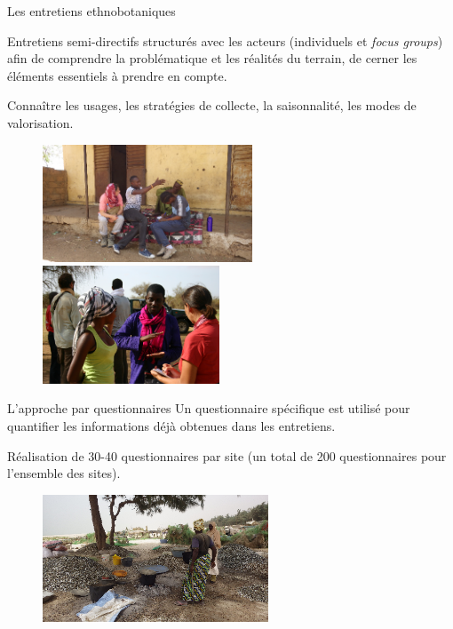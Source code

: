 \documentclass[newPxFont]{beamer}
\begin{document}
\begin{frame}[c]{Les entretiens ethnobotaniques}
\vspace{-1cm}

Entretiens semi-directifs structurés avec les acteurs (individuels et \textit{focus groups}) afin de comprendre la problématique et les réalités du terrain, de cerner les éléments essentiels à prendre en compte.

Connaître les usages, les stratégies de collecte, la saisonnalité, les modes de valorisation.


\begin{figure}
	\centering
	\includegraphics[height = 3.5cm]{img/group3.png}~
  \includegraphics[height = 3.5cm]{img/group2.png}
\end{figure}
\end{frame}

\begin{frame}[c]{L'approche par questionnaires}
\vspace{-1cm}
Un questionnaire spécifique est utilisé pour quantifier les informations déjà obtenues dans les entretiens.

Réalisation de 30-40 questionnaires par site (un total de 200 questionnaires pour l’ensemble des sites).
\begin{figure}
	\centering
	\includegraphics[width = 0.6\textwidth]{img/Khoudia.png}
\end{figure}

\end{frame}
\end{document}
